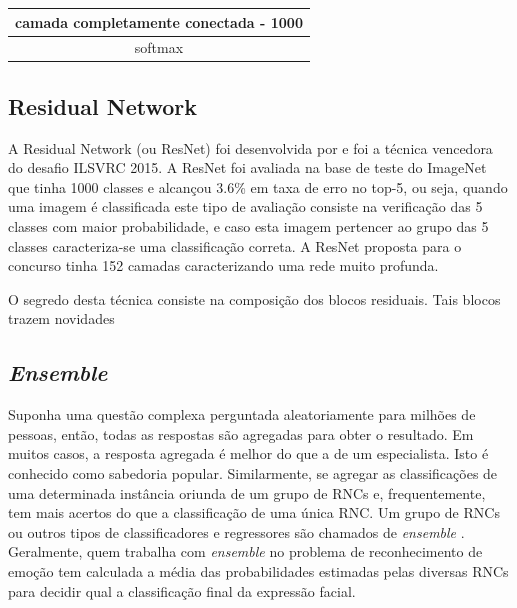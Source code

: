 \begin{table}[]
\begin{tabular}{|c|c|c|c|c|c|}
\multicolumn{6}{|c|}{camada completamente conectada - 1000}                                                                                                                                                                                                                                                                                                                                                                                   \\ \hline
\multicolumn{6}{|c|}{softmax}                                                                                                                                                                                                                                                                                                                                                                                                                 \\ \hline
\end{tabular}
\end{table}

\subsection{Residual Network}
A Residual Network (ou ResNet) foi desenvolvida por \cite{he2016deep} e foi a técnica vencedora do desafio ILSVRC 2015. A ResNet foi avaliada na base de teste do ImageNet que tinha 1000 classes e alcançou 3.6\% em taxa de erro no top-5, ou seja, quando uma imagem é classificada este tipo de avaliação consiste na verificação das 5 classes com maior probabilidade, e caso esta imagem pertencer ao grupo das 5 classes caracteriza-se uma classificação correta. A ResNet proposta para o concurso tinha 152 camadas caracterizando uma rede muito profunda. 

O segredo desta técnica consiste na composição dos blocos residuais. Tais blocos trazem novidades     


\subsection{\textit{Ensemble}}
Suponha uma questão complexa perguntada aleatoriamente para milhões de pessoas, então, todas as respostas são agregadas para obter o resultado. Em muitos casos, a resposta agregada é melhor do que a de um especialista. Isto é conhecido como sabedoria popular. Similarmente, se agregar as classificações de uma determinada instância oriunda de um grupo de RNCs e, frequentemente, tem mais acertos do que a classificação de uma única RNC. Um grupo de RNCs ou outros tipos de classificadores e regressores são chamados de \textit{ensemble} \citep{geron2017hands}. Geralmente, quem trabalha com \textit{ensemble} no problema de reconhecimento de emoção tem calculada a média das probabilidades estimadas pelas diversas RNCs para decidir qual a classificação final da expressão facial.

